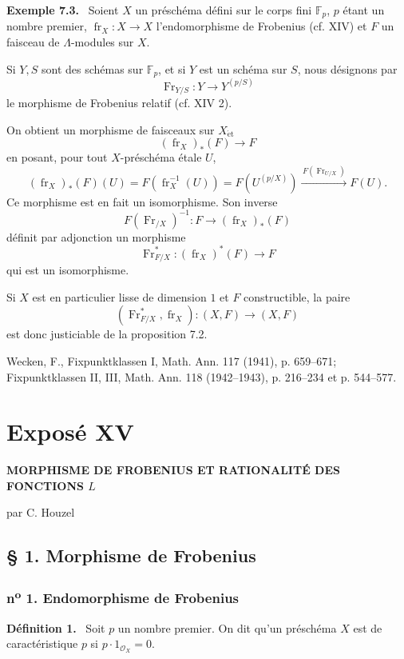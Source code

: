 \documentclass[11pt]{article}
\newenvironment{statement}[1]{\par\medskip\noindent\textbf{#1.}\ }{\par\medskip}
\providecommand{\et}{\mathrm{\acute{e}t}}
\providecommand{\OO}{\mathcal{O}}
\providecommand{\fr}{\operatorname{fr}}
\providecommand{\Fr}{\operatorname{Fr}}
\providecommand{\Fr}{\operatorname{Fr}}
\providecommand{\fr}{\operatorname{fr}}
\providecommand{\et}{\acute{e}t}
\begin{document}
\begin{statement}{Exemple 7.3}
Soient $X$ un préschéma défini sur le corps fini $\mathbb F_p$, $p$ étant un nombre premier, $\fr_X:X\to X$ l'endomorphisme de Frobenius (cf. XIV) et $F$ un faisceau de $\Lambda$-modules sur $X$.

Si $Y,S$ sont des schémas sur $\mathbb F_p$, et si $Y$ est un schéma sur $S$, nous désignons par
\[
\Fr_{Y/S}:Y\longrightarrow Y^{(p/S)}
\]
le morphisme de Frobenius relatif (cf. XIV 2).

On obtient un morphisme de faisceaux sur $X_{\et}$
\[
(\fr_X)_*(F)\longrightarrow F
\]
en posant, pour tout $X$-préschéma étale $U$,
\[
(\fr_X)_*(F)(U)=F(\fr_X^{-1}(U))=F(U^{(p/X)})
 \xrightarrow{\,F(\Fr_{U/X})\,}F(U).
\]
Ce morphisme est en fait un isomorphisme. Son inverse
\[
F(\Fr_{/X})^{-1}:F\longrightarrow (\fr_X)_*(F)
\]
définit par adjonction un morphisme
\[
\Fr_{F/X}^*:(\fr_X)^*(F)\longrightarrow F
\]
qui est un isomorphisme.

Si $X$ est en particulier lisse de dimension $1$ et $F$ constructible, la paire
\[
(\Fr_{F/X}^*,\fr_X):(X,F)\longrightarrow (X,F)
\]
est donc justiciable de la proposition 7.2.
\end{statement}

\noindent[1] Wecken, F., Fixpunktklassen I, Math. Ann. 117 (1941), p. 659--671; Fixpunktklassen II, III, Math. Ann. 118 (1942--1943), p. 216--234 et p. 544--577.

\section*{Exposé XV}
\begin{center}
\Large\bfseries MORPHISME DE FROBENIUS ET RATIONALITÉ DES FONCTIONS $L$

\medskip
par C. Houzel
\end{center}

\subsection*{§ 1. Morphisme de Frobenius}

\subsubsection*{n\textsuperscript{o} 1. Endomorphisme de Frobenius}

\begin{statement}{Définition 1}
Soit $p$ un nombre premier. On dit qu'un préschéma $X$ est de caractéristique $p$ si $p\cdot 1_{\OO_X}=0$.
\end{statement}
\end{document}
